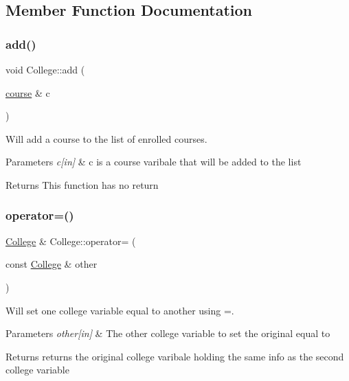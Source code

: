 \subsection{Member Function Documentation}
\mbox{\label{classCollege_a67fd1d8970b46b24ce2e0dd72598a22f}} 
\subsubsection{\texorpdfstring{add()}{add()}}
{\footnotesize\ttfamily void College\+::add (\begin{DoxyParamCaption}\item[{\hyperlink{classcourse}{course} \&}]{c }\end{DoxyParamCaption})}



Will add a course to the list of enrolled courses. 


\begin{DoxyParams}{Parameters}
{\em c\mbox{[}in\mbox{]}} & c is a course varibale that will be added to the list \\
\hline
\end{DoxyParams}
\begin{DoxyReturn}{Returns}
This function has no return 
\end{DoxyReturn}
\mbox{\label{classCollege_af2194c9b37f80d13dc3fdba6784b18e8}} 
\subsubsection{\texorpdfstring{operator=()}{operator=()}}
{\footnotesize\ttfamily \hyperlink{classCollege}{College} \& College\+::operator= (\begin{DoxyParamCaption}\item[{const \hyperlink{classCollege}{College} \&}]{other }\end{DoxyParamCaption})}



Will set one college variable equal to another using =. 


\begin{DoxyParams}{Parameters}
{\em other\mbox{[}in\mbox{]}} & The other college variable to set the original equal to \\
\hline
\end{DoxyParams}
\begin{DoxyReturn}{Returns}
returns the original college varibale holding the same info as the second college variable 
\end{DoxyReturn}
\mbox{\label{classCollege_a4d2ae513b36e6421fb1ca2c08459cfe6}} 

